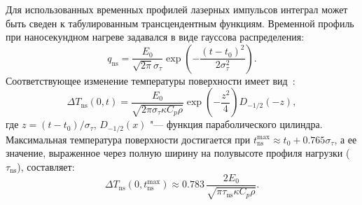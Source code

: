 Для использованных временных профилей лазерных импульсов интеграл может быть сведен к табулированным трансцендентным функциям. Временной профиль при наносекундном нагреве задавался в виде гауссова распределения:
\begin{equation}
    q_\mathrm{ns}=\frac{E_0}{\sqrt{2\pi}\sigma_\tau} \exp \left( -\frac{(t-t_0)^2}{2\sigma_\tau^2} \right).
\end{equation}
Соответствующее изменение температуры поверхности имеет вид~\cite{Bechtel1975}:
\begin{equation}
    \label{eq:dT_ns}
    \Delta T_\mathrm{ns}(0,t) = \frac{E_0}{\sqrt{2\pi\sigma_\tau \kappa C_p \rho}} \exp \left( -\frac{z^2}{4} \right) D_{-1/2}(-z),
\end{equation}
где \( z = (t-t_0)/\sigma_\tau \), \(D_{-1/2}(x) \) "--- функция параболического цилиндра. Максимальная температура поверхности достигается при \( t_\mathrm{ns}^{\max} \approx t_0 + \num{0.765}\sigma_\tau \), а ее значение, выраженное через полную ширину на полувысоте профиля нагрузки (\(\tau_\mathrm{ns}\)), составляет:
\begin{equation}
    \Delta T_\mathrm{ns}(0, t_\mathrm{ns}^{\max}) \approx \num{0.783} \, \frac{2E_0}{\sqrt{\pi \tau_\mathrm{ns} \kappa C_p \rho}}.
\end{equation}

